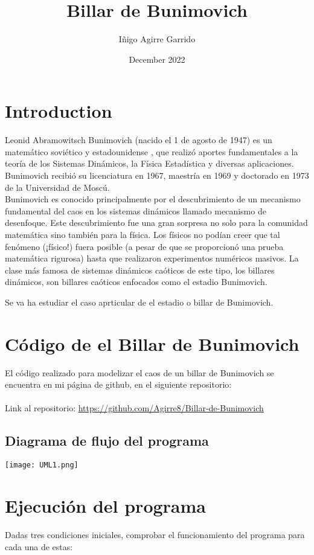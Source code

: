\documentclass{article}
\title{Billar de Bunimovich}
\author{Iñigo Agirre Garrido}
\date{December 2022}
\begin{document}
\maketitle

\section{Introduction}
Leonid Abramowitsch Bunimovich (nacido el 1 de agosto de 1947) es un matemático soviético y estadounidense , que realizó aportes fundamentales a la teoría de los Sistemas Dinámicos, la Física Estadística y diversas aplicaciones. Bunimovich recibió su licenciatura en 1967, maestría en 1969 y doctorado en 1973 de la Universidad de Moscú.
\\

Bunimovich es conocido principalmente por el descubrimiento de un mecanismo fundamental del caos en los sistemas dinámicos llamado mecanismo de desenfoque. Este descubrimiento fue una gran sorpresa no solo para la comunidad matemática sino también para la física. Los físicos no podían creer que tal fenómeno (¡físico!) fuera posible (a pesar de que se proporcionó una prueba matemática rigurosa) hasta que realizaron experimentos numéricos masivos. La clase más famosa de sistemas dinámicos caóticos de este tipo, los billares dinámicos, son billares caóticos enfocados como el estadio Bunimovich.

Se va ha estudiar el caso aprticular de el estadio o billar de Bunimovich.

\section{Código de el Billar de Bunimovich}

El código realizado para modelizar el caos de un billar de Bunimovich se encuentra en mi página de github, en el siguiente repositorio:\\
\\
Link al repositorio: \url{https://github.com/Agirre8/Billar-de-Bunimovich}

\subsection{Diagrama de flujo del programa}
\begin{center}
        \texttt{[image: UML1.png]}
\end{center}
\newpage

\section{Ejecución del programa}
Dadas tres condiciones iniciales, comprobar el funcionamiento del programa para cada una de estas:
\\
\end{document}
